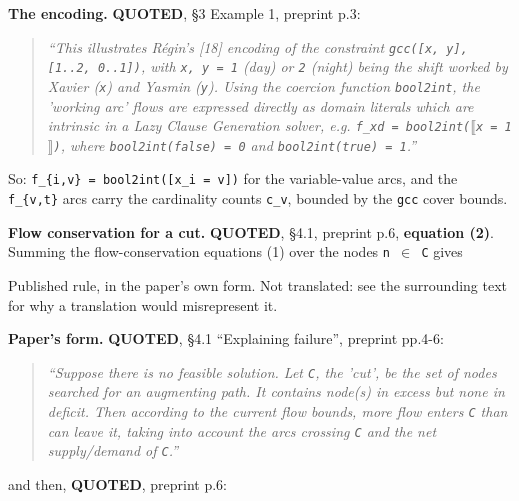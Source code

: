 \documentclass[10pt,a4paper]{article}
\newcommand{\provtag}[2]{{\small\sffamily\bfseries\textcolor{#1}{#2}}}
\newenvironment{pubblock}{%
  \par\smallskip
  \def\FrameCommand{\textcolor{litbar}{\vrule width 2.5pt}\hspace{9pt}}%
  \MakeFramed{\advance\hsize-\width\FrameRestore}}%
  {\endMakeFramed\par\smallskip}
\newcommand{\litsub}[1]{\par\smallskip{\sffamily\bfseries\textcolor{litbar}{#1}\par}}
\newcommand{\rulekind}[1]{\par{\small\sffamily\textcolor{litbar}{#1}\par}}
\newcommand{\litline}[1]{\noindent
  \resizebox{\ifdim\width>\linewidth\linewidth\else\width\fi}{!}{#1}\par}
\begin{document}
\begin{pubblock}
\textbf{The encoding.} \provtag{tagquoted}{QUOTED}, \S{}3 Example 1, preprint p.3:

\begin{quotation}\small\itshape
``This illustrates R\'egin's [18] encoding of the constraint \texttt{gcc([x, y], [1.\allowbreak{}.\allowbreak{}2, 0.\allowbreak{}.\allowbreak{}1])}, with \texttt{x, y = 1} (day) or \texttt{2} (night) being the shift worked by Xavier (\texttt{x}) and Yasmin (\texttt{y}). Using the coercion function \texttt{bool2int}, the 'working arc' flows are expressed directly as domain literals which are intrinsic in a Lazy Clause Generation solver, e.g. \texttt{f\_xd = bool2int($\llbracket$x = 1$\rrbracket$)}, where \texttt{bool2int(false) = 0} and \texttt{bool2int(true) = 1}.''
\end{quotation}
So: \texttt{f\_\allowbreak{}\{i,v\} = bool2int([x\_\allowbreak{}i = v])} for the variable-value arcs, and the \texttt{f\_\{v,t\}} arcs carry the cardinality counts \texttt{c\_v}, bounded by the \texttt{gcc} cover bounds.

\textbf{Flow conservation for a cut.} \provtag{tagquoted}{QUOTED}, \S{}4.1, preprint p.6, \textbf{equation (2)}. Summing the flow-conservation equations (1) over the nodes \texttt{n $\in$ C} gives

\rulekind{Published rule, in the paper's own form. Not translated: see the surrounding text for why a translation would misrepresent it.}
{\raggedright
\litline{\ttfamily\small $\Sigma$\_\{(u,v) leaves C\} f\_uv~~$-$~~$\Sigma$\_\{(u,v) enters C\} f\_uv~~=~~$\Sigma$\_\{n$\in$C\} s\_n~~~~~~~~~~~~~~~~~~~~(2)}
\par}
\par\smallskip
\litsub{Rule 1 --- failure}
\textbf{Paper's form.} \provtag{tagquoted}{QUOTED}, \S{}4.1 ``Explaining failure'', preprint pp.4-6:

\begin{quotation}\small\itshape
``Suppose there is no feasible solution. Let \texttt{C}, the 'cut', be the set of nodes searched for an augmenting path. It contains node(s) in excess but none in deficit. Then according to the current flow bounds, more flow enters \texttt{C} than can leave it, taking into account the arcs crossing \texttt{C} and the net supply/demand of \texttt{C}.''
\end{quotation}
and then, \provtag{tagquoted}{QUOTED}, preprint p.6:


\end{pubblock}
\end{document}
